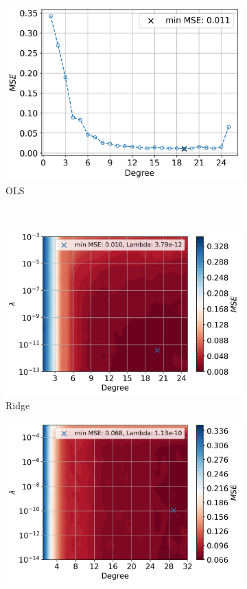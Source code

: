 \documentclass[12pt]{article}
\begin{document}
\begin{figure}[H]
  \begin{subfigure}{\textwidth}
    \centering
    \includegraphics[width=.5\textwidth]{../figures/best_lambda_OLS_00.png}
    \caption{OLS}
    \label{fig:best_ols_real}
  \end{subfigure}\\[1ex]
  \begin{subfigure}{.5\textwidth}
    \centering
    \includegraphics[width=\textwidth]{../figures/best_lambda_RIDGE_00.png}
    \caption{Ridge}
    \label{fig:best_ridge_real}
  \end{subfigure}
  \begin{subfigure}{.5\textwidth}
    \centering
    \includegraphics[width=\textwidth]{../figures/best_lambda_LASSO_00.png}

\end{subfigure}
\end{figure}
\end{document}
